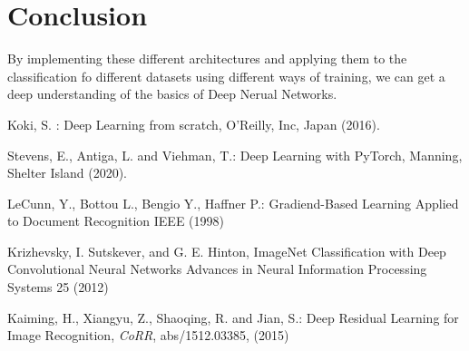 \documentclass[english,preprint,JIP]{ipsj}
\begin{document}
\section{Conclusion}
By implementing these different architectures and applying them to the
classification fo different datasets using different ways of training, we can
get a deep understanding of the basics of Deep Nerual Networks.

\begin{thebibliography}{99}
    Koki, S. :
    Deep Learning from scratch,
    O'Reilly, Inc,
    Japan (2016).

    Stevens, E., Antiga, L. and Viehman, T.:
    Deep Learning with PyTorch,
    Manning, Shelter Island (2020).


    LeCunn, Y., Bottou L., Bengio Y., Haffner P.:
    Gradiend-Based Learning Applied to Document Recognition
    IEEE (1998)

    Krizhevsky, I. Sutskever, and G. E. Hinton,
    ImageNet Classification with Deep Convolutional Neural Networks
    Advances in Neural Information Processing Systems 25 (2012)

    Kaiming, H., Xiangyu, Z., Shaoqing, R. and Jian, S.:
    Deep Residual Learning for Image Recognition,
    {\it CoRR},
    abs/1512.03385,
    (2015)
\end{thebibliography}
\end{document}
